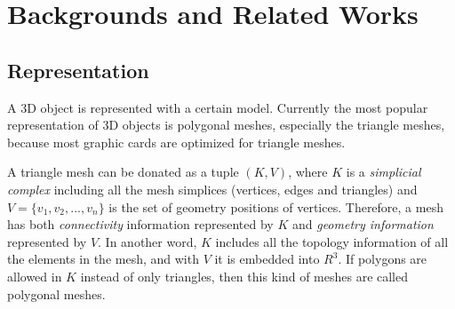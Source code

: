 \documentclass[11pt, a4paper]{report}
\begin{document}
    \section{Backgrounds and Related Works}
    \subsection{Representation}
    \label{s:intro:representation}
    A 3D object is represented with a certain model.
    Currently the most popular representation of 3D objects is polygonal meshes, 
    especially the triangle meshes, because most graphic cards are optimized for triangle meshes. 

    A triangle mesh can be donated as a tuple $(K, V)$, where $K$ is a
    \emph{simplicial complex} including all the mesh simplices 
    (vertices, edges and triangles) and $V =\{v_{1}, v_{2}, ...,
    v_{n}\}$ is the set of geometry positions of vertices. Therefore,
    a mesh has both \emph{connectivity} information represented by $K$
    and \emph{geometry information} represented by $V$. In another
    word, $K$ includes all the topology information of all the
    elements in the mesh, and with $V$ it is embedded into $R^{3}$. If
    polygons are allowed in $K$ instead of only triangles, then this
    kind of meshes are called polygonal meshes.
\end{document}

